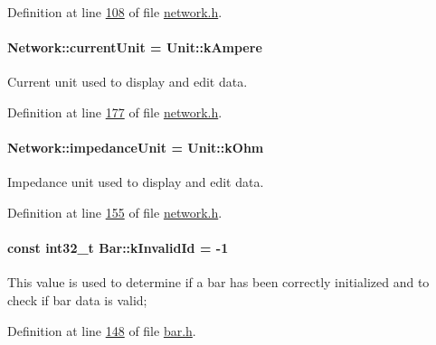 Definition at line \hyperlink{network_8h_source_l00108}{108} of file \hyperlink{network_8h_source}{network.\+h}.

\hypertarget{group___models_gac6a26db5fef2b1dd2a00faf6340d1702}{}
\paragraph[{current\+Unit}]{ Network\+::current\+Unit = {\bf Unit\+::k\+Ampere}\hspace{0.3cm}{\ttfamily [static]}}\label{group___models_gac6a26db5fef2b1dd2a00faf6340d1702}
Current unit used to display and edit data. 

Definition at line \hyperlink{network_8h_source_l00177}{177} of file \hyperlink{network_8h_source}{network.\+h}.

\hypertarget{group___models_ga5f3d72699a723c64a89d22e34df708ff}{}
\paragraph[{impedance\+Unit}]{ Network\+::impedance\+Unit = {\bf Unit\+::k\+Ohm}\hspace{0.3cm}{\ttfamily [static]}}\label{group___models_ga5f3d72699a723c64a89d22e34df708ff}
Impedance unit used to display and edit data. 

Definition at line \hyperlink{network_8h_source_l00155}{155} of file \hyperlink{network_8h_source}{network.\+h}.

\hypertarget{group___models_ga9919592c0397ed41448dfb20b607d738}{}
\paragraph[{k\+Invalid\+Id}]{\setlength{\rightskip}{0pt plus 5cm}const int32\+\_\+t Bar\+::k\+Invalid\+Id = -\/1\hspace{0.3cm}{\ttfamily [static]}}\label{group___models_ga9919592c0397ed41448dfb20b607d738}
This value is used to determine if a bar has been correctly initialized and to check if bar data is valid; 

Definition at line \hyperlink{bar_8h_source_l00148}{148} of file \hyperlink{bar_8h_source}{bar.\+h}.

